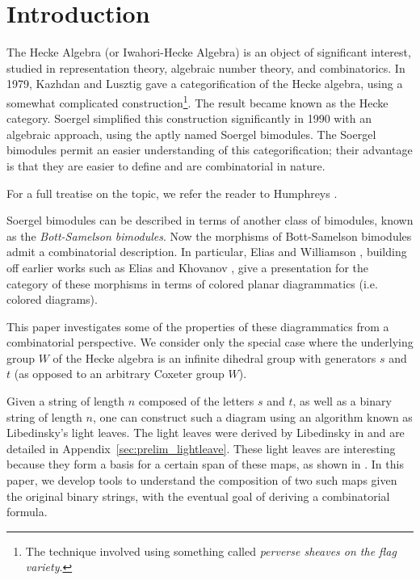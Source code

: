 
\section{Introduction}

The Hecke Algebra (or Iwahori-Hecke Algebra) is an object of significant interest, studied in representation theory, algebraic number theory, and combinatorics.  In 1979, Kazhdan and Lusztig \cite{ref:KaLu1,ref:KaLu2} gave a categorification of the Hecke algebra, using a somewhat complicated construction\footnote{The technique involved using something called \emph{perverse sheaves on the flag variety}.}.  The result became known as the Hecke category.
Soergel \cite{ref:Soe1,ref:Soe2} simplified this construction significantly in 1990 with an algebraic approach, using the aptly named Soergel bimodules.  The Soergel bimodules permit an easier understanding of this categorification; their advantage is that they are easier to define and are combinatorial in nature.

For a full treatise on the topic, we refer the reader to Humphreys \cite{ref:Humphreys}.

Soergel bimodules can be described in terms of another class of bimodules, known as the \emph{Bott-Samelson bimodules}.
Now the morphisms of Bott-Samelson bimodules admit a combinatorial description.  In particular, Elias and Williamson \cite{ref:gr4all}, building off earlier works such as Elias and Khovanov \cite{ref:EKh}, give a presentation for the category of these morphisms in terms of colored planar diagrammatics (i.e. colored diagrams). 

This paper investigates some of the properties of these diagrammatics from a combinatorial perspective.   We consider only the special case where the underlying group $W$ of the Hecke algebra is an infinite dihedral group with generators $s$ and $t$ (as opposed to an arbitrary Coxeter group $W$).

Given a string of length $n$ composed of the letters $s$ and $t$, as well as a binary string of length $n$, one can construct such a diagram using an algorithm known as Libedinsky's light leaves.  The light leaves were derived by Libedinsky in \cite{ref:Lib} and are detailed in Appendix~\ref{sec:prelim_lightleave}.  
These light leaves are interesting because they form a basis for a certain span of these maps, as shown in \cite{ref:gr4all}.
In this paper, we develop tools to understand the composition of two such maps given the original binary strings, with the eventual goal of deriving a combinatorial formula.

